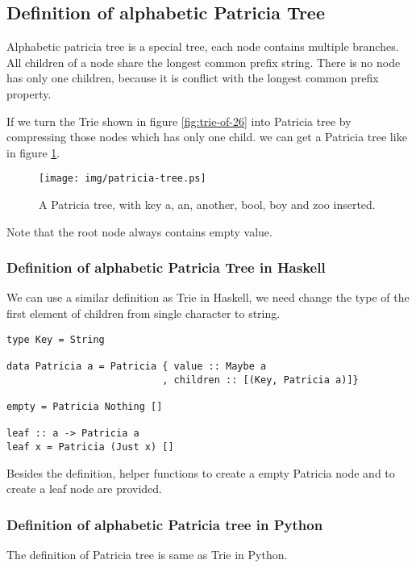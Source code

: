 \documentclass{article}
\begin{document}
\subsection{Definition of alphabetic Patricia Tree}
Alphabetic patricia tree is a special tree, each node contains
multiple branches. All children of a node share the longest common
prefix string. There is no node has only one children, because it
is conflict with the longest common prefix property.

If we turn the Trie shown in figure \ref{fig:trie-of-26} into Patricia
tree by compressing those nodes which has only one child. we can get
a Patricia tree like in figure \ref{fig:patricia-tree}.

\begin{figure}[htbp]
  \begin{center}
    \texttt{[image: img/patricia-tree.ps]}
      \caption{A Patricia tree, with key a, an, another, bool,
    boy and zoo inserted.}
      \label{fig:patricia-tree}
  \end{center}
\end{figure}

Note that the root node always contains empty value.

\subsubsection*{Definition of alphabetic Patricia Tree in Haskell}
We can use a similar definition as Trie in Haskell, we need change
the type of the first element of children from single character to
string.

\lstset{language=Haskell}
\begin{lstlisting}
type Key = String

data Patricia a = Patricia { value :: Maybe a
                           , children :: [(Key, Patricia a)]}

empty = Patricia Nothing []

leaf :: a -> Patricia a
leaf x = Patricia (Just x) []
\end{lstlisting}

Besides the definition, helper functions to create a empty
Patricia node and to create a leaf node are provided.

\subsubsection*{Definition of alphabetic Patricia tree in Python}
The definition of Patricia tree is same as Trie in Python.
\end{document}
